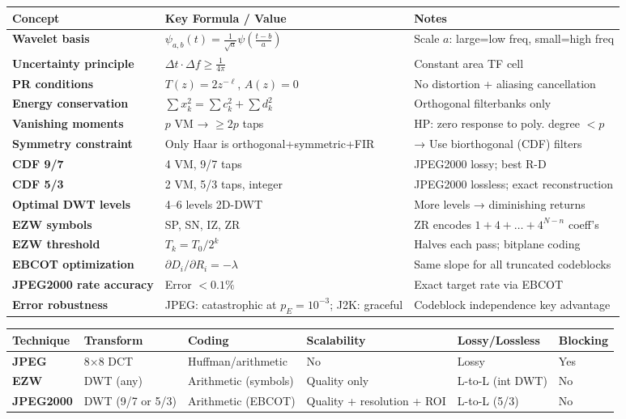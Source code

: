 \begin{center}
\begin{tabular}{|l|l|l|}
\hline
\textbf{Concept} & \textbf{Key Formula / Value} & \textbf{Notes} \\ \hline
\textbf{Wavelet basis} & $\psi_{a,b}(t) = \frac{1}{\sqrt{a}}\psi\left(\frac{t-b}{a}\right)$ & Scale $a$: large=low freq, small=high freq \\ \hline
\textbf{Uncertainty principle} & $\Delta t \cdot \Delta f \geq \frac{1}{4\pi}$ & Constant area TF cell \\ \hline
\textbf{PR conditions} & $T(z) = 2z^{-\ell}$, $A(z) = 0$ & No distortion + aliasing cancellation \\ \hline
\textbf{Energy conservation} & $\sum x_k^2 = \sum c_k^2 + \sum d_k^2$ & Orthogonal filterbanks only \\ \hline
\textbf{Vanishing moments} & $p$ VM → $\geq 2p$ taps & HP: zero response to poly. degree $< p$ \\ \hline
\textbf{Symmetry constraint} & Only Haar is orthogonal+symmetric+FIR & → Use biorthogonal (CDF) filters \\ \hline
\textbf{CDF 9/7} & 4 VM, 9/7 taps & JPEG2000 lossy; best R-D \\ \hline
\textbf{CDF 5/3} & 2 VM, 5/3 taps, integer & JPEG2000 lossless; exact reconstruction \\ \hline
\textbf{Optimal DWT levels} & 4–6 levels 2D-DWT & More levels → diminishing returns \\ \hline
\textbf{EZW symbols} & SP, SN, IZ, ZR & ZR encodes $1+4+\ldots+4^{N-n}$ coeff's \\ \hline
\textbf{EZW threshold} & $T_k = T_0 / 2^k$ & Halves each pass; bitplane coding \\ \hline
\textbf{EBCOT optimization} & $\partial D_i/\partial R_i = -\lambda$ & Same slope for all truncated codeblocks \\ \hline
\textbf{JPEG2000 rate accuracy} & Error $< 0.1\%$ & Exact target rate via EBCOT \\ \hline
\textbf{Error robustness} & JPEG: catastrophic at $p_E=10^{-3}$; J2K: graceful & Codeblock independence key advantage \\ \hline
\end{tabular}
\end{center}

\begin{center}
\begin{tabular}{|l|l|l|l|l|l|}
\hline
\textbf{Technique} & \textbf{Transform} & \textbf{Coding} & \textbf{Scalability} & \textbf{Lossy/Lossless} & \textbf{Blocking} \\ \hline
\textbf{JPEG} & 8×8 DCT & Huffman/arithmetic & No & Lossy & Yes \\ \hline
\textbf{EZW} & DWT (any) & Arithmetic (symbols) & Quality only & L-to-L (int DWT) & No \\ \hline
\textbf{JPEG2000} & DWT (9/7 or 5/3) & Arithmetic (EBCOT) & Quality + resolution + ROI & L-to-L (5/3) & No \\ \hline
\end{tabular}
\end{center}

